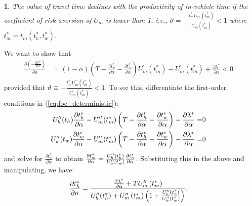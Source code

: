 \documentclass[12pt,a4paper,british]{article}
\makeatletter
\theoremstyle{definition}
\theoremstyle{plain}
\newenvironment{proof}[1][\proofname]{\par
    \normalfont\topsep6\p@\@plus6\p@\relax
    \trivlist
    \itemindent\parindent
    \item[\hskip\labelsep
          \scshape
      #1]\ignorespaces
  }{%
    \endtrivlist\@endpefalse
  }
\providecommand{\proofname}{Proof}
\theoremstyle{plain}
\newtheorem{prop}{\protect\propositionname}
\theoremstyle{plain}
\providecommand{\propositionname}{Proposition}
\makeatother
\begin{document}
\begin{prop}
The value of travel time declines with the productivity of in-vehicle time if the coefficient of risk aversion of $U_{m}$ is lower than 1, i.e., $\vartheta=-\frac{t_{m}^{\ast}U_{m}^{\prime\prime}\left(t_{m}^{\ast}\right)}{U_{m}^{\prime}\left(t_{m}^{\ast}\right)}<1$ where $t_{m}^{\ast}=t_{m}\left(t_{h}^{\ast},t_{w}^{\ast}\right)$.
\end{prop}


\begin{proof}
We want to show that
\begin{align*}
\frac{\partial\left(-\frac{\mathrm{d}U^{\ast}}{\mathrm{d}T}\right)}{\partial\alpha} & =\left(1-\alpha\right)\left(T-\frac{\partial t_{h}^{\ast}}{\partial\alpha}-\frac{\partial t_{w}^{\ast}}{\partial\alpha}\right)U_{m}^{\prime\prime}\left(t_{m}^{\ast}\right)-U_{m}^{\prime}\left(t_{m}^{\ast}\right)+\frac{\partial\lambda^{\ast}}{\partial\alpha}<0
\end{align*}
provided that $\vartheta\equiv-\frac{t_{m}^{\ast}U_{m}^{\prime\prime}\left(t_{m}^{\ast}\right)}{U_{m}^{\prime}\left(t_{m}^{\ast}\right)}<1$. To see this, differentiate the first-order conditions in (\ref{eq:foc_deterministic}):
\begin{align*}
U_{h}^{\prime\prime}\text{\ensuremath{\left(t_{h}\right)}}\frac{\partial t_{h}^{\ast}}{\partial\alpha}-U_{m}^{\prime\prime}\text{\ensuremath{\left(t_{m}^{\ast}\right)}}\left(T-\frac{\partial t_{h}^{\ast}}{\partial\alpha}-\frac{\partial t_{w}^{\ast}}{\partial\alpha}\right)-\frac{\partial\lambda^{\ast}}{\partial\alpha}= & 0\\
U_{w}^{\prime\prime}\text{\ensuremath{\left(t_{w}\right)}}\frac{\partial t_{w}^{\ast}}{\partial\alpha}-U_{m}^{\prime\prime}\text{\ensuremath{\left(t_{m}^{\ast}\right)}}\left(T-\frac{\partial t_{h}^{\ast}}{\partial\alpha}-\frac{\partial t_{w}^{\ast}}{\partial\alpha}\right)-\frac{\partial\lambda^{\ast}}{\partial\alpha}= & 0
\end{align*}
and solve for $\frac{\partial t_{w}^{\ast}}{\partial\alpha}$ to obtain $\frac{\partial t_{w}^{\ast}}{\partial\alpha}=\frac{U_{h}^{\prime\prime}\text{\ensuremath{\left(t_{h}^{\ast}\right)}}}{U_{w}^{\prime\prime}\text{\ensuremath{\left(t_{w}^{\ast}\right)}}}\frac{\partial t_{h}^{\ast}}{\text{\ensuremath{\partial\alpha}}}$. Substituting this in the above and manipulating, we have: 
\begin{equation*}
\frac{\partial t_{h}^{\ast}}{\partial\alpha}=\frac{\frac{\partial\lambda^{\ast}}{\partial\alpha}+TU_{m}^{\prime\prime}\left(t_{m}^{\ast}\right)}{U_{h}^{\prime\prime}\text{\ensuremath{\left(t_{h}^{\ast}\right)}}+U_{m}^{\prime\prime}\left(t_{m}^{\ast}\right)\left(1+\frac{U_{h}^{\prime\prime}\text{\ensuremath{\left(t_{h}^{\ast}\right)}}}{U_{w}^{\prime\prime}\text{\ensuremath{\left(t_{w}^{\ast}\right)}}}\right)}.

\end{equation*}
\end{proof}
\end{document}

